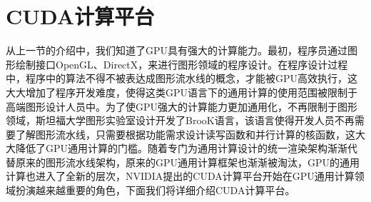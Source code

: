 

\section{CUDA计算平台}
从上一节的介绍中，我们知道了GPU具有强大的计算能力。最初，程序员通过图形绘制接口OpenGL、DirectX，来进行图形领域的程序设计。在程序设计过程中，程序中的算法不得不被表达成图形流水线的概念，才能被GPU高效执行，这大大增加了程序开发难度，使得这类GPU语言下的通用计算的使用范围被限制于高端图形设计人员中。为了使GPU强大的计算能力更加通用化，不再限制于图形领域，斯坦福大学图形实验室设计开发了BrooK语言，该语言使得开发人员不再需要了解图形流水线，只需要根据功能需求设计读写函数和并行计算的核函数，这大大降低了GPU通用计算的门槛。随着专门为通用计算设计的统一渲染架构渐渐代替原来的图形流水线架构，原来的GPU通用计算框架也渐渐被淘汰，GPU的通用计算也进入了全新的层次，NVIDIA提出的CUDA计算平台开始在GPU通用计算领域扮演越来越重要的角色，下面我们将详细介绍CUDA计算平台。
